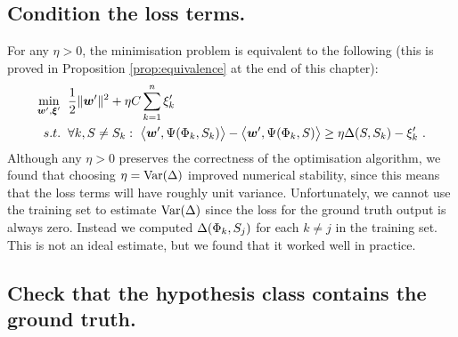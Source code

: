 \subsection{Condition the loss terms.}

For any $\eta>0$, the minimisation problem  is
equivalent to the following (this is proved in Proposition
\ref{prop:equivalence} at the end of this chapter):
\begin{equation}
  \begin{split}
    \min_{\Model',\Slacks'} &
      \hspace{2mm} 
    \frac{1}{2} \|\Model'\|^2 +
      \eta C \sum_{k=1}^n \Slack_k'\\
    s.t. & \hspace{2mm} \forall k, \Seam \neq \Seam_k:~
      \bigl\langle\Model', \JointFtr(\Features_k,\Seam_k)\bigr\rangle -
      \bigl\langle\Model', \JointFtr(\Features_k,\Seam)\bigr\rangle
      \geq
      \eta \Loss(\Seam,\Seam_k) - \Slack_k' ~.
  \end{split}
  \label{eq:equiv-problem}
\end{equation}
Although any $\eta>0$ preserves the correctness of the optimisation
algorithm, we found that choosing $\eta=\mbox{Var}(\Loss)$ improved
numerical stability, since this means that the loss terms will have
roughly unit variance. Unfortunately, we cannot use the training set
to estimate $\mbox{Var}(\Loss)$ since the loss for the ground truth
output is always zero. Instead we computed
$\Loss(\Features_k,\Seam_j)$ for each $k \neq j$ in the training
set. This is not an ideal estimate, but we found that it worked well
in practice.

\subsection{Check that the hypothesis class contains the ground
  truth.}

